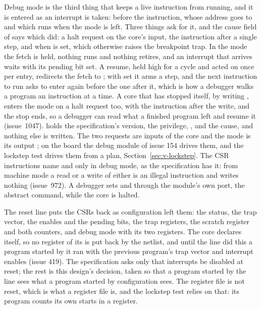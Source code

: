 \documentclass[journal,onecolumn,9pt]{IEEEtran}
\begin{document}
Debug mode is the third thing that keeps a live instruction from
running, and it is entered as an interrupt is taken: before the
instruction, whose address goes to  and which runs when
the mode is left. Three things ask for it, and the cause field of
 says which did: a halt request on the core's
 input, the instruction after a single step, and
 when  is set, which otherwise
raises the breakpoint trap. In the mode the fetch is held, nothing
runs and nothing retires, and an interrupt that arrives waits with
its pending bit set. A resume,  held high for a
cycle and acted on once per entry, redirects the fetch to
; with  set it arms a step, and the next
instruction to run asks to enter again before the one after it,
which is how a debugger walks a program an instruction at a time.
A core that has stopped itself, by writing , enters the
mode on a halt request too, with  the instruction after the
write, and the stop ends, so a debugger can read what a finished
program left and resume it (issue~1047).
 holds the specification's version, the privilege,
,  and the cause, and nothing else is
written. The two requests are inputs of the core and the mode is
its output ; on the board the debug module of issue 154
drives them, and the lockstep test drives them from a plan,
Section~\ref{sec:v-lockstep}. The CSR instructions name 
and  only in debug mode, as the specification has it: from
machine mode a read or a write of either is an illegal instruction
and writes nothing (issue~972). A debugger sets  and
 through the module's own port, the abstract command,
while the core is halted.

The reset line puts the CSRs back as configuration left them: the
status, the trap vector, the enables and the pending bits, the trap
registers, the scratch register and both counters, and debug mode
with its two registers. The core declares  itself, so no
register of its is put back by the netlist, and until the line did
this a program started by it ran with the previous program's trap
vector and interrupt enables (issue 419). The specification asks only
that interrupts be disabled at reset; the rest is this design's
decision, taken so that a program started by the line sees what a
program started by configuration sees. The register file is not
reset, which is what a register file is, and the lockstep test relies
on that: its program counts its own starts in a register.
\end{document}
